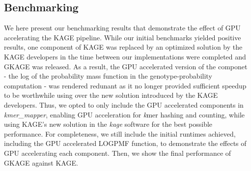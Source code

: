 \subsection{Benchmarking} \label{results:benchmarking}
We here present our benchmarking results that demonstrate the effect of GPU accelerating the KAGE pipeline.
While our initial benchmarks yielded positive results, one component of KAGE was replaced by an optimized solution by the KAGE developers in the time between our implementations were completed and GKAGE was released.
As a result, the GPU accelerated version of the componet - the log of the probability mass function in the genotype-probability computation - was rendered redunant as it no longer provided sufficient speedup to be worthwhile using over the new solution introduced by the KAGE developers.
Thus, we opted to only include the GPU accelerated components in \textit{kmer\_mapper}, enabling GPU acceleration for \textit{k}mer hashing and counting, while using KAGE's new solution in the \textit{kage} software for the best possible performance.
For completeness, we still include the initial runtimes achieved, including the GPU accelerated LOGPMF function, to demonstrate the effects of GPU accelerating each component.
Then, we show the final performance of GKAGE against KAGE.

